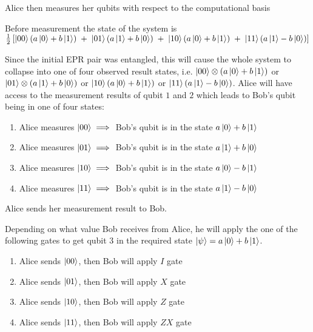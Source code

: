 \documentclass[12pt,twoside,fleqn]{report}
\theoremstyle{thmstyle}
\newenvironment{step}[1]
  {\renewcommand\theinnerstep{#1}\innerstep}
{\endinnerstep}
\begin{document}
\begin{step}{3} Alice then measures her qubits with respect to the computational basis


Before measurement the state of the system is
    $\frac{1}{2} \left [ \ket{00} (a \ket{0} + b \ket{1}) \; + \; \ket{01} ( a \ket{1} + b \ket{0} ) \; + \; \ket{10} (a \ket{0} + b \ket{1} ) \; + \; \ket{11} (a \ket{1} - b \ket{0}) \right]$

    Since the initial EPR pair was entangled, this will cause the whole system to collapse into one of four observed result states, i.e. $\ket{00} \otimes (a \ket{0} + b \ket{1})$ or $\ket{01} \otimes ( a \ket{1} + b \ket{0} )$ or $\ket{10} (a \ket{0} + b \ket{1} )$ or $\ket{11} (a \ket{1} - b \ket{0})$. Alice will have access to the measurement results of qubit $1$ and $2$ which leads to Bob's qubit being in one of four states:

\begin{enumerate}
    \item  Alice measures $\ket{00} \implies $ Bob's qubit is in the state $a \ket{0} + b \ket{1}$
    \item  Alice measures $\ket{01} \implies $ Bob's qubit is in the state $a \ket{1} + b \ket{0}$
    \item  Alice measures $\ket{10} \implies $ Bob's qubit is in the state $a \ket{0} - b \ket{1}$
    \item Alice measures $\ket{11} \implies $ Bob's qubit is in the state $a \ket{1} - b \ket{0}$
\end{enumerate}

\end{step}

\begin{step}{4} Alice sends her measurement result to Bob.

Depending on what value Bob receives from Alice, he will apply the one of the following gates to get qubit $3$ in the required state $\ket\psi = a \ket{0} + b \ket{1}$.

\begin{enumerate}
    \item Alice sends $\ket{00}$, then Bob will apply $I$ gate
    \item  Alice sends $\ket{01}$, then Bob will apply $X$ gate
    \item Alice sends $\ket{10}$, then Bob will apply $Z$ gate
    \item Alice sends $\ket{11}$, then Bob will apply $ZX$ gate
\end{enumerate}

\end{step}
\end{document}
